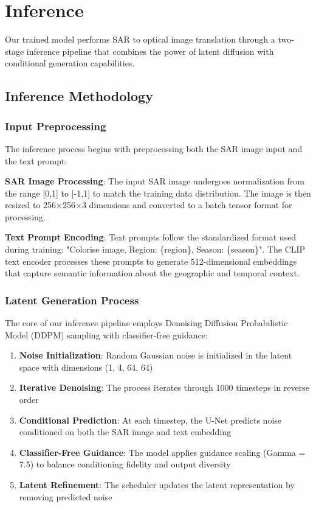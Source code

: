 \section{Inference}

Our trained model performs SAR to optical image translation through a two-stage inference pipeline that combines the power of latent diffusion with conditional generation capabilities.

\subsection{Inference Methodology}

\subsubsection{Input Preprocessing}

The inference process begins with preprocessing both the SAR image input and the text prompt:

\textbf{SAR Image Processing}:
The input SAR image undergoes normalization from the range [0,1] to [-1,1] to match the training data distribution. The image is then resized to 256×256×3 dimensions and converted to a batch tensor format for processing.

\textbf{Text Prompt Encoding}:
Text prompts follow the standardized format used during training: "Colorise image, Region: \{region\}, Season: \{season\}". The CLIP text encoder processes these prompts to generate 512-dimensional embeddings that capture semantic information about the geographic and temporal context.

\subsubsection{Latent Generation Process}

The core of our inference pipeline employs Denoising Diffusion Probabilistic Model (DDPM)\cite{ho2020denoisingdiffusionprobabilisticmodels} sampling with classifier-free guidance:

\begin{enumerate}
    \item \textbf{Noise Initialization}: Random Gaussian noise is initialized in the latent space with dimensions (1, 4, 64, 64)
    \item \textbf{Iterative Denoising}: The process iterates through 1000 timesteps in reverse order
    \item \textbf{Conditional Prediction}: At each timestep, the U-Net predicts noise conditioned on both the SAR image and text embedding
    \item \textbf{Classifier-Free Guidance}: The model applies guidance scaling (Gamma = 7.5) to balance conditioning fidelity and output diversity
    \item \textbf{Latent Refinement}: The scheduler updates the latent representation by removing predicted noise
\end{enumerate}

